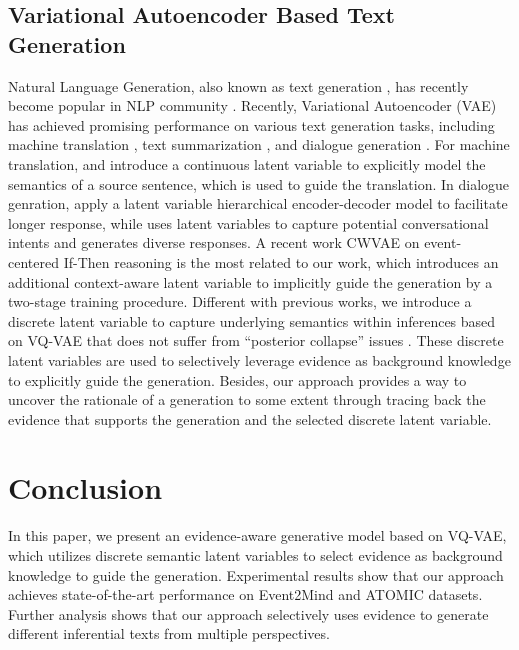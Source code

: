\documentclass[11pt,a4paper]{article}
\begin{document}
\subsection{Variational Autoencoder Based Text Generation}
Natural Language Generation, also known as text
generation \cite{mckeown1992text,sutskever2011generating}, has recently become popular in NLP community \cite{feng2018topic,duan2020pretrain}. Recently, Variational Autoencoder (VAE) \cite{kingma2013auto} has achieved promising performance on various text generation tasks, including machine translation \cite{zhang2016variational,su2018variational}, text summarization \cite{miao2016language,li2017deep}, and dialogue generation \cite{serban2017hierarchical,zhao2017learning}. 
For machine translation, \citet{zhang2016variational} and \citet{su2018variational} introduce a continuous latent variable to explicitly model the semantics of a source sentence, which is used to guide the translation. In dialogue genration, \citet{serban2017hierarchical} apply a latent variable hierarchical encoder-decoder model to facilitate longer response, while \citet{zhao2017learning} uses latent variables to capture potential conversational intents and generates diverse responses.  
A recent work CWVAE \cite{du2019modeling} on event-centered If-Then reasoning is the most related to our work, which introduces an additional context-aware \mbox{latent} variable to implicitly guide the generation by a two-stage training procedure. 
Different with previous works, we introduce a discrete latent variable to capture underlying semantics within inferences based on VQ-VAE that does not suffer from ``posterior collapse'' issues \cite{van2017neural}. These discrete latent variables are used to selectively leverage evidence as background knowledge to explicitly guide the generation. Besides, our approach provides a way to uncover the rationale of a generation to some extent through tracing back the evidence that supports the generation and the selected discrete latent variable.

\section{Conclusion}
In this paper, we present an evidence-aware generative model based on VQ-VAE, which utilizes discrete semantic latent variables to select evidence as background knowledge to guide the generation. Experimental results show that our approach achieves state-of-the-art performance on Event2Mind and ATOMIC datasets. Further analysis shows that our approach selectively uses evidence to generate different inferential texts from multiple perspectives. 
\end{document}
